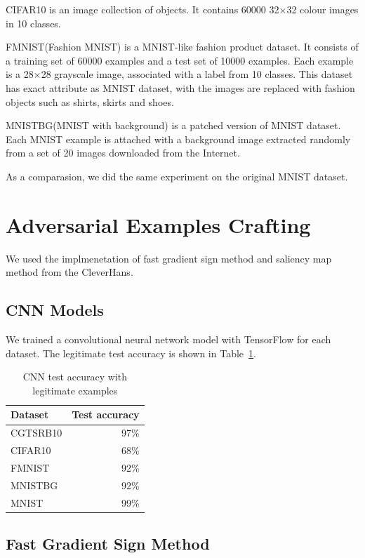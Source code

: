 \documentclass{article}
\begin{document}
CIFAR10\cite{cifar10} is an image collection of objects. It contains 60000 32$\times$32 colour images in 10 classes.

FMNIST(Fashion MNIST)\cite{fmnist} is a MNIST-like fashion product dataset. It consists of a training set of 60000 examples and a test set of 10000 examples. Each example is a 28$\times$28 grayscale image, associated with a label from 10 classes. This dataset has exact attribute as MNIST dataset\cite{mnist}, with the images are replaced with fashion objects such as shirts, skirts and shoes.

MNISTBG(MNIST with background)\cite{mnistbg} is a patched version of MNIST dataset. Each MNIST example is attached with a background image extracted randomly from a set of 20 images downloaded from the Internet.

As a comparasion, we did the same experiment on the original MNIST dataset.


\section{Adversarial Examples Crafting}

We used the implmenetation of fast gradient sign method and saliency map method from the CleverHans\cite{cleverhans}.

\subsection{CNN Models}

We trained a convolutional neural network model with TensorFlow\cite{tensorflow} for each dataset.
The legitimate test accuracy is shown in Table~\ref{tab:cnnaccuracy}.

\begin{table}
\centering
\begin{tabular}{lr}
    \toprule
    Dataset & Test accuracy \\
    \midrule
    CGTSRB10 & 97\% \\
    CIFAR10 & 68\% \\
    FMNIST & 92\% \\
    MNISTBG & 92\% \\
    MNIST & 99\% \\
    \bottomrule
\end{tabular}
\caption{\label{tab:cnnaccuracy} CNN test accuracy with legitimate examples}
\end{table}


\subsection{Fast Gradient Sign Method}
\end{document}
